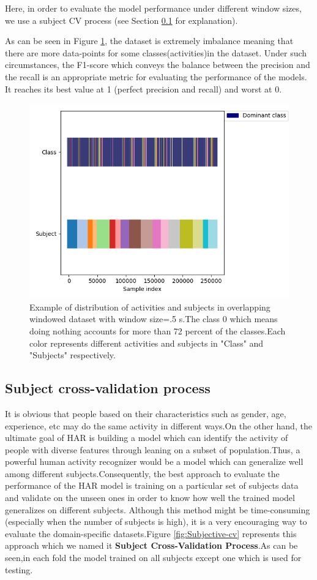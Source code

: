Here, in order to evaluate the model performance under different window sizes, we use a subject CV process (see Section \ref{sub:subjective CV} for explanation).

As can be seen in Figure \ref{fig:class}, the dataset is extremely imbalance meaning that there are more data-points for some classes(activities)in the dataset. Under such circumstances, the F1-score which conveys the balance between the precision and the recall is an appropriate metric for evaluating the performance of the models. It reaches its best value at 1 (perfect precision and recall) and worst at 0.

\begin{figure}[h]
    \centering
    \includegraphics[width=.4\textwidth]{Figures/Class_subject.png}
    \caption{Example of distribution of activities and subjects in overlapping windowed dataset with window size=.5 s.The class 0 which means doing nothing accounts for more than 72 percent of the classes.Each color represents different activities and subjects in "Class" and "Subjects" respectively.}
    \label{fig:class}
\end{figure}

\subsection{Subject cross-validation process} \label{sub:subjective CV}
It is obvious that people based on their characteristics such as gender, age, experience, etc may do the same activity in different ways.On the other hand, the ultimate goal of HAR is building a model which can identify the activity of people with diverse features through leaning on a subset of population.Thus, a powerful human activity recognizer would be a model which can generalize well among different subjects.Consequently, the best approach to evaluate the performance of the HAR model is training on a particular set of subjects data and validate on the unseen ones in order to know how well the trained model generalizes on different subjects. Although this method might be time-consuming (especially when the number of subjects is high), it is a very encouraging way to evaluate the domain-specific datasets.Figure \ref{fig:Subjective-cv} represents this approach which we named it \textbf{Subject Cross-Validation Process}.As can be seen,in each fold the model trained on all subjects except one which is used for testing.




